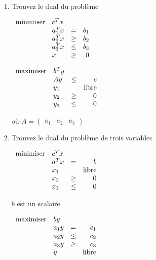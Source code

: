 \begin{enumerate}
  \item Trouvez le dual du problème

    $
    \begin{array}{llcr}
      \mbox{minimiser} & c^T x\\
      & a_1^T x& = & b_1\\
      & a_2^T  x & \geq & b_2\\
      & a_3^T x & \leq & b_3\\
      & x& \geq & 0
    \end{array}
    $

    \begin{solution}
      $
      \begin{array}{llcr}
        \mbox{maximiser} & b^T y\\
        & Ay & \leq & c\\
        & y_1 & & \text{libre}\\
        & y_2 & \geq & 0\\
        & y_3 & \leq & 0
      \end{array}
      $

      où $A = \begin{pmatrix}a_1 & a_2 & a_3\end{pmatrix}$
    \end{solution}

  \item Trouvez le dual du problème de trois variables

    $
    \begin{array}{llcr}
      \mbox{minimiser} & c^T x\\
      & a^T x& = & b\\
      & x_1 &  & \mbox{libre}\\
      & x_2 & \geq & 0\\
      & x_3 & \leq & 0
    \end{array}
    $

    \begin{solution}
      $b$ est un scalaire

      $
      \begin{array}{llcr}
        \mbox{maximiser} & b y\\
        & a_1 y & = & c_1\\
        & a_2 y & \leq & c_2\\
        & a_3 y & \geq & c_3\\
        & y & & \text{libre}
      \end{array}
      $
    \end{solution}


\end{enumerate}
